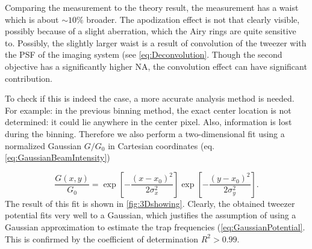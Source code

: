 Comparing the measurement to the theory result, the measurement has a waist which is about $\sim 10\%$ broader. 
The apodization effect is not that clearly visible, possibly because of a slight aberration, which the Airy rings are quite sensitive to.
Possibly, the slightly larger waist is a result of convolution of the tweezer with the \ac{PSF} of the imaging system (see \cref{eq:Deconvolution}. Though the second objective has a significantly higher NA, the convolution effect can have significant contribution.

To check if this is indeed the case, a more accurate analysis method is needed.
For example: in the previous binning method, the exact center location is not determined: it could lie anywhere in the center pixel. 
Also, information is lost during the binning. 
Therefore we also perform a two-dimensional fit using a normalized Gaussian $G/G_0$ in Cartesian coordinates (eq. \ref{eq:GaussianBeamIntensity})

\begin{equation}\label{eq:2DGaussian}
    \frac{G(x,y)}{G_0} =  
    \exp{\left[ -\frac{(x-x_0)^2}{2\sigma_x^2}\right]}
    \exp{\left[ -\frac{(y-x_0)^2}{2\sigma_y^2}\right]}.
\end{equation}
The result of this fit is shown in \cref{fig:3Dshowing}. 
Clearly, the obtained tweezer potential fits very well to a Gaussian, which justifies the assumption of using a Gaussian approximation to estimate the trap frequencies (\cref{eq:GaussianPotential}. 
This is confirmed by the coefficient of determination $R^2 > 0.99$.

